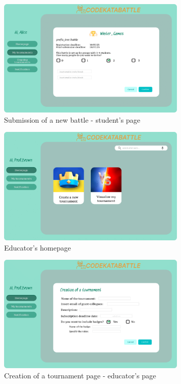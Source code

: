 \begin{figure}[H]
    \centering
    \includegraphics[width=0.8\textwidth]{images/user_interface/UI_sw2-09.png}
    \caption{Submission of a new battle - student's page}
\end{figure}

\begin{figure}[H]
    \centering
    \includegraphics[width=0.8\textwidth]{images/user_interface/UI_sw2-10.png}
    \caption{Educator's homepage}
\end{figure}

\begin{figure}[H]
    \centering
    \includegraphics[width=0.8\textwidth]{images/user_interface/UI_sw2-11.png}
    \caption{Creation of a tournament page - educator's page}
\end{figure}

